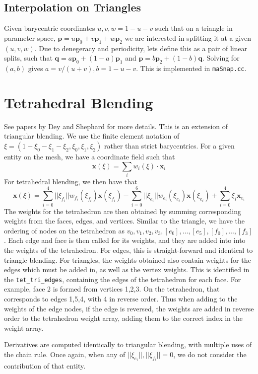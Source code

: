 \documentclass{article}
\begin{document}
\subsection{Interpolation on Triangles}
Given barycentric coordinates $u,v,w=1-u-v$ such that on a triangle in parameter space, $\mathbf{p} = u\mathbf{p}_0 + v\mathbf{p}_1 + w\mathbf{p}_2$ we are interested in splitting it at a given $(u,v,w)$. Due to denegeracy and periodicity, lets define this as a pair of linear splits, such that $ \mathbf{q} = a\mathbf{p}_0 + (1-a)\mathbf{p}_1 $ and $\mathbf{p} = b\mathbf{p}_2 + (1-b)\mathbf{q}$. Solving for $(a,b)$ gives $ a = v/(u+v), b = 1-u-v$. This is implemented in \texttt{maSnap.cc}.
\section{Tetrahedral Blending}
See papers by Dey and Shephard for more details. This is an extension of triangular blending. We use the finite element notation of $\xi = (1-\xi_0-\xi_1-\xi_2,\xi_0,\xi_1,\xi_2)$ rather than strict barycentrics. For a given entity on the mesh, we have a coordinate field such that 
\[ \mathbf{x}(\xi) = \sum_i w_i(\xi) \cdot \mathbf{x}_i \]
For tetrahedral blending, we then have that
\[\mathbf{x}(\xi) = \sum_{i=0}^{4}||\xi_{f_i}||w_{f_i}(\xi_{f_i})\mathbf{x}(\xi_{f_i}) - \sum_{i=0}^{6}||\xi_{e_i}||w_{e_i}(\xi_{e_i})\mathbf{x}(\xi_{e_i}) + \sum_{i=0}^{4}\xi_i\mathbf{x}_{v_i}\]
The weights for the tetrahedron are then obtained by summing corresponding weights from the faces, edges, and vertices. Similar to the triangle, we have the ordering of nodes on the tetrahedron as $v_0,v_1,v_2,v_3,[e_0],\ldots,[e_5],[f_0],\ldots,[f_3]$. Each edge and face is then called for its weights, and they are added into into the weights of the tetrahedron. For edges, this is straight-forward and identical to triangle blending. For triangles, the weights obtained also contain weights for the edges which must be added in, as well as the vertex weights. This is identified in the 
\texttt{tet\_tri\_edges}, containing the edges of the tetrahedron for each face. For example, face 2 is formed from vertices 1,2,3. On the tetrahedron, that corresponds to edges 1,5,4, with 4 in reverse order. Thus when adding to the weights of the edge nodes, if the edge is reversed, the weights are added in reverse order to the tetrahedron weight array, adding them to the correct index in the weight array.

Derivatives are computed identically to triangular blending, with multiple uses of the chain rule. Once again, when any of $||\xi_{e_i}||,||\xi_{f_i}|| = 0$, we do not consider the contribution of that entity.
\end{document}
